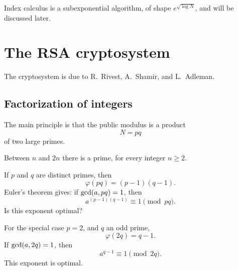 Index calculus is a subexponential algorithm, of shape
\(e^{\sqrt{\log N}}\), and will be discussed later.

\section{The RSA cryptosystem}

The cryptosystem is due to R.~Rivest, A.~Shamir, and L.~Adleman.

\subsection{Factorization of integers}
The main principle is that the public modulus is a product
\[
    N=pq
\]
of two large primes.

\begin{theorem}
Between \(n\) and \(2n\) there is a prime, for every integer \(n\ge 2\).
\end{theorem}

If \(p\) and \(q\) are distinct primes, then
\[
    \varphi(pq)=(p-1)(q-1).
\]
Euler's theorem gives: if \(\operatorname{gcd}(a,pq)=1\), then
\[
    a^{(p-1)(q-1)}\equiv 1\pmod{pq}.
\]
Is this exponent optimal?

For the special case \(p=2\), and \(q\) an odd prime,
\[
    \varphi(2q)=q-1.
\]
If \(\operatorname{gcd}(a,2q)=1\), then
\[
    a^{q-1}\equiv 1\pmod{2q}.
\]
This exponent is optimal.
